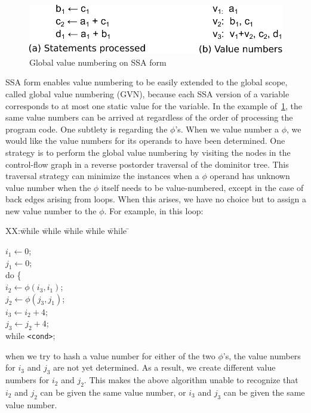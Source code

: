 \begin{figure}[t]
\centering
\includegraphics[scale=0.55]{fig-glob-value-num.pdf}
\caption{Global value numbering on SSA form}
\label{fig: glob-value-num}
\end{figure}

SSA form enables value numbering to be easily extended to the global scope,
called global value numbering (GVN), because each SSA version of a variable
corresponds to at most one static value for the variable.  In the example
of~\ref{fig: glob-value-num}, the same value numbers can be arrived at
regardless of the order of processing the program code.  One subtlety is
regarding the $\phi$'s.  When we value number a $\phi$, we would like the
value numbers for its operands to have been determined.  One strategy is to
perform the global value numbering by visiting the nodes in the control-flow graph in a reverse postorder traversal of the dominitor tree.
This traversal strategy can minimize the instances when a $\phi$ operand has 
unknown value number when the $\phi$ itself needs to be value-numbered,
except in the case of back edges arising from loops.  When this arises,
we have no choice but to assign a new value number to the $\phi$.
For example, in this loop:
\begin{tabbing}
XX:\= while \= while \= while \= while \= while \= \kill

\> \> $i_1 \leftarrow 0$; \\
\> \> $j_1 \leftarrow 0$; \\
\> \> do \{ \\
\> \> \> $i_2 \leftarrow \phi(i_3, i_1)$; \\
\> \> \> $j_2 \leftarrow \phi(j_3, j_1)$; \\
\> \> \> $i_3 \leftarrow i_2 + 4$; \\
\> \> \> $j_3 \leftarrow j_2 + 4$; \\
\> \> while \texttt{<cond>}; \\
\end{tabbing}
when we try to hash a value number for either of the two $\phi$'s, the value
numbers for $i_3$ and $j_3$ are not yet determined.  As a result, we create
different value numbers for $i_2$ and $j_2$.  This makes the above algorithm
unable to recognize that $i_2$ and $j_2$ can be given the same value number,
or $i_3$ and $j_3$ can be given the same value number.

